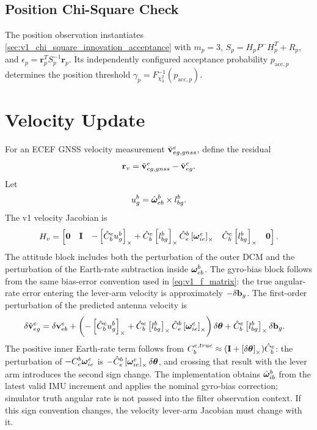 \subsection{Position Chi-Square Check}

The position observation instantiates
\cref{sec:v1_chi_square_innovation_acceptance} with $m_p=3$,
$S_p=H_pP^-H_p^T+R_p$, and
$\epsilon_p=\mathbf{r}_p^TS_p^{-1}\mathbf{r}_p$. Its independently configured
acceptance probability $p_{\mathrm{acc},p}$ determines the position threshold
$\gamma_p=F_{\chi^2_3}^{-1}(p_{\mathrm{acc},p})$.

\section{Velocity Update}

For an ECEF GNSS velocity measurement $\tilde{\mathbf{v}}_{eg,gnss}^{e}$, define the
residual
\begin{equation}
\mathbf{r}_v
=
\tilde{\mathbf{v}}_{eg,gnss}^{e}
-
\hat{\mathbf{v}}_{eg}^{e}.
\end{equation}
Let
\begin{equation}
u_g^b
=
\hat{\boldsymbol{\omega}}_{eb}^{b}
\times
l_{bg}^{b}.
\end{equation}
The v1 velocity Jacobian is
\begin{equation}
H_v
=
\begin{bmatrix}
\mathbf{0} &
\mathbf{I} &
-\left[\hat{C}_b^e u_g^b\right]_{\times}
+
\hat{C}_b^e\left[l_{bg}^{b}\right]_{\times}\hat{C}_e^b\left[\boldsymbol{\omega}_{ie}^{e}\right]_{\times} &
\hat{C}_b^e\left[l_{bg}^{b}\right]_{\times} &
\mathbf{0}
\end{bmatrix}.
\label{eq:v1_gnss_vel_h}
\end{equation}
The attitude block includes both the perturbation of the outer DCM and the
perturbation of the Earth-rate subtraction inside $\boldsymbol{\omega}_{eb}^{b}$. The
gyro-bias block follows from the same bias-error convention used in
\cref{eq:v1_f_matrix}: the true angular-rate error entering the lever-arm
velocity is approximately $-\delta\mathbf{b}_g$. The first-order perturbation of the
predicted antenna velocity is
\begin{align}
\delta\hat{\mathbf{v}}_{eg}^{e}
&=
\delta\mathbf{v}_{eb}^{e}
+
\left(
-\left[\hat{C}_b^e u_g^b\right]_{\times}
+
\hat{C}_b^e\left[l_{bg}^{b}\right]_{\times}\hat{C}_e^b\left[\boldsymbol{\omega}_{ie}^{e}\right]_{\times}
\right)
\delta\boldsymbol{\theta}
+
\hat{C}_b^e\left[l_{bg}^{b}\right]_{\times}\delta\mathbf{b}_g.
\label{eq:v1_gnss_vel_perturbation}
\end{align}
The positive inner Earth-rate term follows from
$C_b^{e,true}\approx(\mathbf{I}+\left[\delta\boldsymbol{\theta}\right]_{\times})\hat C_b^e$:
the perturbation of $-C_e^b\boldsymbol{\omega}_{ie}^e$ is
$-\hat C_e^b\left[\boldsymbol{\omega}_{ie}^e\right]_{\times}\delta\boldsymbol{\theta}$, and crossing
that result with the lever arm introduces the second sign change. The
implementation obtains $\hat{\boldsymbol{\omega}}_{ib}^b$ from the latest valid IMU
increment and applies the nominal gyro-bias correction; simulator truth
angular rate is not passed into the filter observation context.
If this sign convention changes, the velocity lever-arm Jacobian must change
with it.

